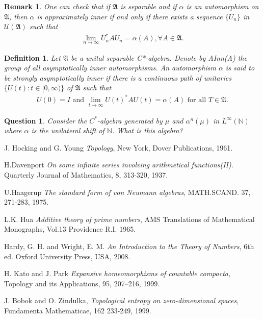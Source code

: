 \documentclass[a4paper,10pt]{amsart}
\newtheorem{definition}{Definition}[section]
\newtheorem{remark}{Remark}[section]
\newtheorem{question}{Question}[section]
\newcommand{\AAA}{\mathfrak A}
\newcommand{\N}{\mathbb N} %
\begin{document}
\begin{remark}
    One can check that if $\AAA$ is separable and if $\alpha$ is
    an automorphism on $\AAA$, then $\alpha$ is approximately inner
    if and only if there exists a sequence $\{U_{n}\}$ in 
    $\mathcal{U}(\AAA)$ such that 
    \begin{align*}
        \lim_{n \rightarrow \infty}U^{*}_{n}AU_{n} = \alpha(A), 
        \forall A \in \AAA.
    \end{align*}
\end{remark}

\begin{definition}
Let $\AAA$ be a unital separable C*-algebra. 
Denote by AInn(A)
the group of all asymptotically inner automorphisms. 
An automorphism $\alpha$ is said to be strongly asymptotically 
inner if there is a continuous path of unitaries 
$\{ U(t): t \in [0, \infty)\}$ of $\AAA$ such that
\begin{align*}
    U(0) = I \mbox{ and } \lim_{t \rightarrow \infty}U(t)^{*}AU(t) =
    \alpha(A) \mbox{ for all } T \in \AAA.
    \end{align*}
\end{definition}

\begin{question}
    Consider the $C^{*}$-algebra generated by $\mu$ and $\alpha^{n}(\mu)$
    in $L^{\infty}(\N)$ where $\alpha$ is the unilateral shift of $\N$.
    What is this algebra?
\end{question}

\begin{thebibliography}{9}
   J. Hocking and G. Young
   \emph{Topology},
   New York, Dover Publications, 1961.

  H.Davenport
  \emph{On some infinite series involving arithmetical functions(II)}.
  Quarterly Journal of Mathematics, 8,
  313-320, 1937.

  U.Haagerup 
  \emph{The standard form of von Neumann algebras},
  MATH.SCAND. 37, 271-283, 1975.

    L.K. Hua
    \emph{Additive theory of prime numbers},
    AMS Translations of Mathematical Monographs, Vol.13
    Providence R.I. 1965.

      Hardy, G. H. and Wright, E. M. 
      \emph{An Introduction to the Theory of Numbers}, 
      6th ed. Oxford University Press, USA, 2008. 

  H. Kato and J. Park
  \emph{Expansive homeomorphisms of countable compacta},
  Topology and its Applications, 95, 207–216, 1999.

    J. Bobok and O. Zindulka,
    \emph{Topological entropy on zero-dimensional spaces},
    Fundamenta Mathematicae, 162 233-249, 1999.

\end{thebibliography}
\end{document}
